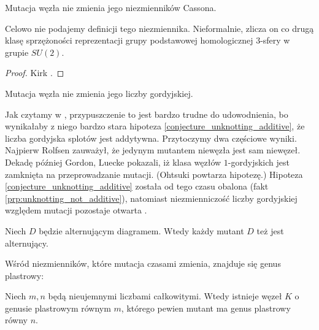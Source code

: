 \begin{proposition}
%
    Mutacja węzła nie zmienia jego niezmienników Cassona.
\end{proposition}

Celowo nie podajemy definicji tego niezmiennika.
Nieformalnie, zlicza on co drugą klasę sprzężoności reprezentacji grupy podstawowej homologicznej 3-sfery w grupie $SU(2)$.

\begin{proof}
%
    Kirk \cite{kirk1989}.
\end{proof}

\begin{conjecture}
    Mutacja węzła nie zmienia jego liczby gordyjskiej.
\end{conjecture}

Jak czytamy w \cite[problem 1.69]{kirby1978}, przypuszczenie to jest bardzo trudne do udowodnienia, bo wynikałaby z niego bardzo stara hipoteza \ref{conjecture_unknotting_additive}, że liczba gordyjska splotów jest addytywna.
%
Przytoczymy dwa częściowe wyniki.
Najpierw Rolfsen \cite{rolfsen1993} zauważył, że jedynym mutantem niewęzła jest sam niewęzeł.
%
Dekadę później Gordon, Luecke \cite{gordon2006} pokazali, iż klasa węzłów $1$-gordyjskich jest zamknięta na przeprowadzanie mutacji.
%
%
(Ohtsuki \cite[problem 12.15]{ohtsuki2002} powtarza hipotezę.)
%
Hipoteza \ref{conjecture_unknotting_additive} została od tego czasu obalona (fakt \ref{prp:unknotting_not_additive}), natomiast niezmienniczość liczby gordyjskiej względem mutacji pozostaje otwarta \cite[problem 1.3]{baykur2026}.

\begin{proposition}
    Niech $D$ będzie alternującym diagramem.
    Wtedy każdy mutant $D$ też jest alternujący.
\end{proposition}

Wśród niezmienników, które mutacja czasami zmienia, znajduje się genus plastrowy:

\begin{proposition}
%
    Niech $m, n$ będą nieujemnymi liczbami całkowitymi.
    Wtedy istnieje węzeł $K$ o genusie plastrowym równym $m$, którego pewien mutant ma genus plastrowy równy $n$.
\end{proposition}

